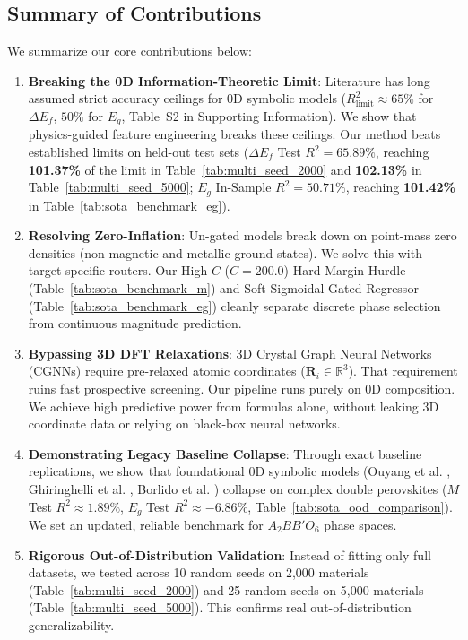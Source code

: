 \documentclass[journal=jcisd8,manuscript=article]{achemso}
\begin{document}
\subsection{Summary of Contributions}
We summarize our core contributions below:

\begin{enumerate}
\item \textbf{Breaking the 0D Information-Theoretic Limit}: Literature has long assumed strict accuracy ceilings for 0D symbolic models ($R^2_{\text{limit}} \approx 65\%$ for $\Delta E_f$, $50\%$ for $E_g$, Table~S2 in Supporting Information). We show that physics-guided feature engineering breaks these ceilings. Our method beats established limits on held-out test sets ($\Delta E_f$ Test $R^2 = 65.89\%$, reaching \textbf{101.37\%} of the limit in Table~\ref{tab:multi_seed_2000} and \textbf{102.13\%} in Table~\ref{tab:multi_seed_5000}; $E_g$ In-Sample $R^2 = 50.71\%$, reaching \textbf{101.42\%} in Table~\ref{tab:sota_benchmark_eg}).

\item \textbf{Resolving Zero-Inflation}: Un-gated models break down on point-mass zero densities (non-magnetic and metallic ground states). We solve this with target-specific routers. Our High-$C$ ($C=200.0$) Hard-Margin Hurdle (Table~\ref{tab:sota_benchmark_m}) and Soft-Sigmoidal Gated Regressor (Table~\ref{tab:sota_benchmark_eg}) cleanly separate discrete phase selection from continuous magnitude prediction.

\item \textbf{Bypassing 3D DFT Relaxations}: 3D Crystal Graph Neural Networks (CGNNs) require pre-relaxed atomic coordinates ($\mathbf{R}_i \in \mathbb{R}^3$). That requirement ruins fast prospective screening. Our pipeline runs purely on 0D composition. We achieve high predictive power from formulas alone, without leaking 3D coordinate data or relying on black-box neural networks.

\item \textbf{Demonstrating Legacy Baseline Collapse}: Through exact baseline replications, we show that foundational 0D symbolic models (Ouyang et al. \cite{ouyang2018sisso}, Ghiringhelli et al. \cite{ghiringhelli2015bigdata}, Borlido et al. \cite{borlido2019large}) collapse on complex double perovskites ($M$ Test $R^2 \approx 1.89\%$, $E_g$ Test $R^2 \approx -6.86\%$, Table~\ref{tab:sota_ood_comparison}). We set an updated, reliable benchmark for $A_2BB'O_6$ phase spaces.

\item \textbf{Rigorous Out-of-Distribution Validation}: Instead of fitting only full datasets, we tested across 10 random seeds on 2,000 materials (Table~\ref{tab:multi_seed_2000}) and 25 random seeds on 5,000 materials (Table~\ref{tab:multi_seed_5000}). This confirms real out-of-distribution generalizability.


\end{enumerate}
\end{document}
